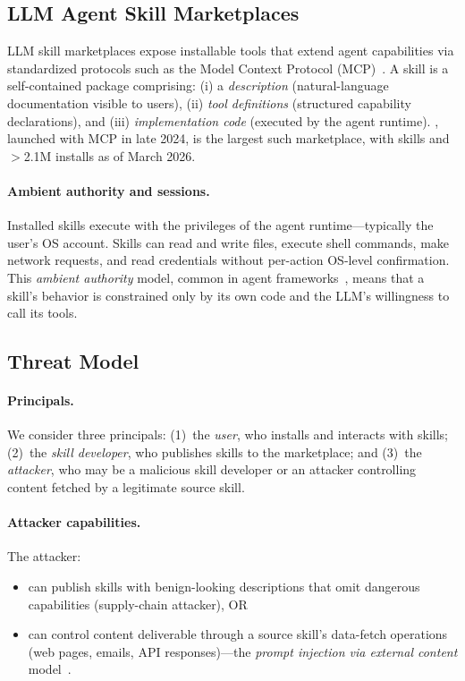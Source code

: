 
\subsection{LLM Agent Skill Marketplaces}

LLM skill marketplaces expose installable tools that extend agent
capabilities via standardized protocols such as the Model Context Protocol (MCP)~\cite{anthropic2024mcp}.
A skill is a self-contained package comprising:
(i) a \emph{description} (natural-language documentation visible to users),
(ii) \emph{tool definitions} (structured capability declarations),
and (iii) \emph{implementation code} (executed by the agent runtime).
\clawhub, launched with MCP in late 2024, is the largest such marketplace,
with \NskillsCH skills and $>$2.1M installs as of March 2026.

\paragraph{Ambient authority and sessions.}
Installed skills execute with the privileges of the agent runtime---typically
the user's OS account.
Skills can read and write files, execute shell commands, make network requests,
and read credentials without per-action OS-level confirmation.
This \emph{ambient authority} model, common in agent frameworks~\cite{ruan2024identifying},
means that a skill's behavior is constrained only by its own code
and the LLM's willingness to call its tools.

\subsection{Threat Model}

\paragraph{Principals.}
We consider three principals:
(1)~the \emph{user}, who installs and interacts with skills;
(2)~the \emph{skill developer}, who publishes skills to the marketplace;
and (3)~the \emph{attacker}, who may be a malicious skill developer
or an attacker controlling content fetched by a legitimate source skill.

\paragraph{Attacker capabilities.}
The attacker:
\begin{itemize}[leftmargin=*,topsep=2pt]
  \item can publish skills with benign-looking descriptions
    that omit dangerous capabilities (supply-chain attacker), OR
  \item can control content deliverable through a source skill's
    data-fetch operations (\eg web pages, emails, API responses)---the
    \emph{prompt injection via external content} model~\cite{greshake2023indirect}.
\end{itemize}

